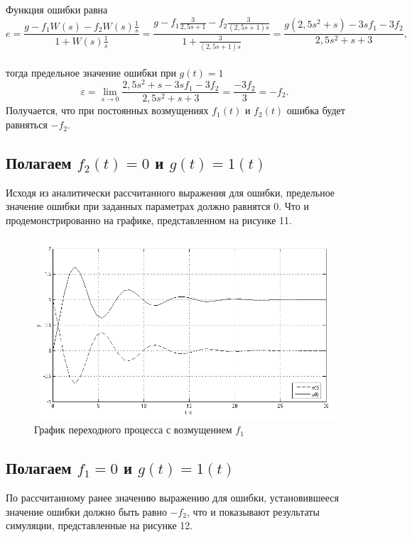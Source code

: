 \documentclass[a4paper, 11pt, russian]{article}
\begin{document}
    Функция ошибки равна $$e = \frac{g - f_1W(s) - f_2W(s)\displaystyle{\frac{1}{s}}}{1 + W(s)\displaystyle{\frac{1}{s}}} = \frac{g - f_1\displaystyle{\frac{3}{2,5s + 1}} - f_2\displaystyle{\frac{3}{(2,5s + 1)s}}}{1 + \displaystyle{\frac{3}{(2,5s + 1)s}}} = \frac{g(2,5s^2 + s) - 3sf_1 - 3f_2}{2,5s^2 + s + 3},$$\\
    тогда предельное значение ошибки при $g(t) = 1$ $$\varepsilon = \lim_{s\to0} \frac{2,5s^2 + s - 3sf_1 - 3f_2}{2,5s^2 + s + 3} = \frac{-3f_2}{3} = -f_2.$$
    Получается, что при постоянных возмущениях $f_1(t)$ и $f_2(t)$ ошибка будет равняться $-f_2$.
    \subsection{Полагаем $f_2(t) = 0$ и $g(t) = 1(t)$}
    Исходя из аналитически рассчитанного выражения для ошибки, предельное значение ошибки при заданных параметрах должно равнятся 0. Что и продемонстрированно на графике, представленном на рисунке 11.
    
    \begin{figure}[ht!]
        \centering
        \includegraphics[scale = 0.75]{disturbance1.png}
        \caption{График переходного процесса с возмущением $f_1$}
    \end{figure}
    \vspace{4.5cm}
    \subsection{Полагаем $f_1 = 0$ и $g(t) = 1(t)$}
    По рассчитанному ранее значению выражению для ошибки, установившееся значение ошибки должно быть равно $-f_2$, что и показывают результаты симуляции, представленные на рисунке 12.
    
\end{document}

